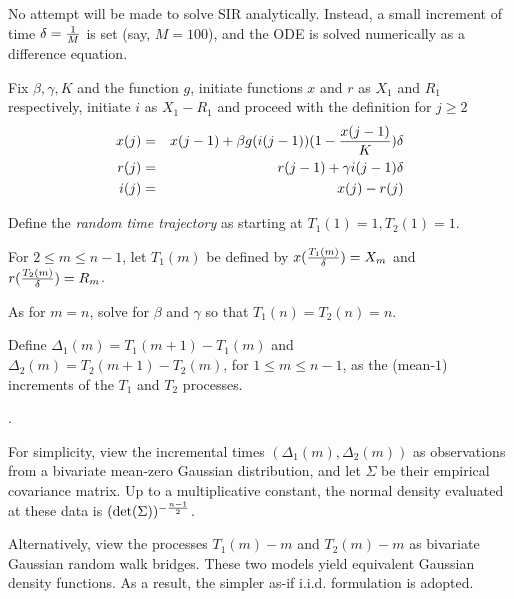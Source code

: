 \documentclass{article}
\begin{document}
\noindent No attempt will be made to solve SIR analytically. Instead, a small increment of time $\delta={1 \over M}$ is set (say, $M=100$), and the ODE is solved numerically as a difference equation.

\newpage

\noindent Fix $\beta, \gamma, K$ and the function $g$, initiate functions $x$ and $r$ as $X_1$ and $R_1$ respectively, initiate $i$ as $X_1-R_1$ and proceed with the definition for $j \ge 2$
\begin{eqnarray}
x(j)&=&x(j-1)+\beta g(i(j-1))(1-{{x(j-1)} \over K}) \delta \nonumber \\
r(j)&=&r(j-1)+\gamma i(j-1) \delta \nonumber \\
i(j)&=&x(j)-r(j) \label{thesolution}
\end{eqnarray}

\bigskip

\noindent Define the {\em random time trajectory} as starting at $T_1(1)=1, T_2(1)=1$.

\bigskip

\noindent For $2 \le m \le n-1$, let $T_1(m)$ be defined by $x({{T_1(m)} \over \delta}) = X_m$ and $r({{T_2(m)} \over \delta}) = R_m$.

\bigskip

\noindent As for $m=n$, solve for $\beta$ and $\gamma$ so that $T_1(n)=T_2(n)=n$. 

\bigskip

\noindent Define $\Delta_1(m)=T_1(m+1)-T_1(m)$ and $\Delta_2(m)=T_2(m+1)-T_2(m)$, for $1 \le m \le n-1$, as the (mean-$1$) increments of the $T_1$ and $T_2$ processes.

\newpage

.

\bigskip

\noindent For simplicity, view the incremental times $(\Delta_1(m),\Delta_2(m))$ as observations from a bivariate mean-zero Gaussian distribution, and let $\Sigma$ be their empirical covariance matrix. Up to a multiplicative constant, the normal density evaluated at these data is $(\det(\Sigma))^{-{{n-1} \over 2}}$.

\bigskip

\noindent Alternatively, view the processes $T_1(m)-m$ and $T_2(m)-m$ as bivariate Gaussian random walk bridges.
These two models yield equivalent Gaussian density functions. As a result, the simpler as-if i.i.d. formulation is adopted.
\end{document}
